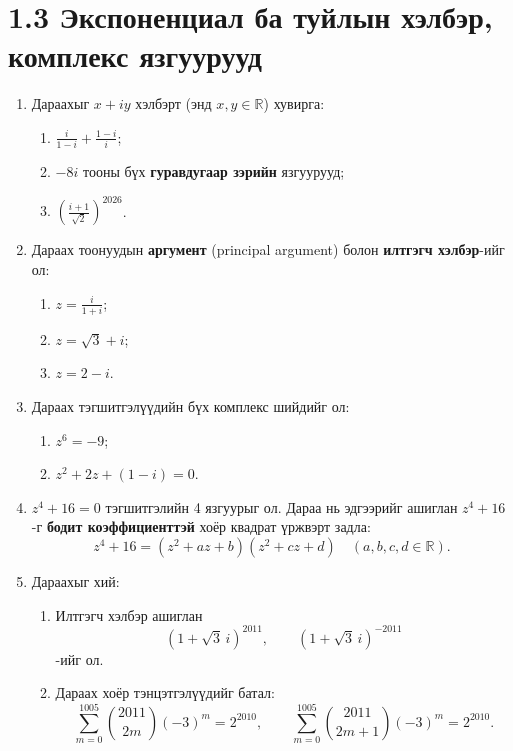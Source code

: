 \section*{1.3 Экспоненциал ба туйлын хэлбэр, комплекс язгуурууд}
\begin{enumerate}[label=\textbf{3.\arabic*}, itemsep=8pt]

\item Дараахыг $x+iy$ хэлбэрт (энд $x,y\in\mathbb R$) хувирга:
\begin{enumerate}[label=\textbf{(\alph*)}]
\item $\displaystyle \frac{i}{1-i}+\frac{1-i}{i}$;
\item $-8i$ тооны бүх \textbf{гуравдугаар зэрийн} язгуурууд;
\item $\left(\frac{i+1}{\sqrt2}\right)^{2026}$.
\end{enumerate}

\item Дараах тоонуудын \textbf{ аргумент} (principal argument) болон \textbf{илтгэгч хэлбэр}-ийг ол:
\begin{enumerate}[label=\textbf{(\alph*)}]
\item $\displaystyle z=\frac{i}{1+i}$;
\item $z=\sqrt3+i$;
\item $z=2-i$.
\end{enumerate}

\item Дараах тэгшитгэлүүдийн бүх комплекс шийдийг ол:
\begin{enumerate}[label=\textbf{(\alph*)}]
\item $z^6=-9$;
\item $z^2+2z+(1-i)=0$.
\end{enumerate}

\item $z^4+16=0$ тэгшитгэлийн 4 язгуурыг ол.
Дараа нь эдгээрийг ашиглан $z^4+16$-г \textbf{бодит коэффициенттэй} хоёр квадрат үржвэрт задла:
\[
z^4+16=(z^2+az+b)(z^2+cz+d)\quad (a,b,c,d\in\mathbb R).
\]

\item Дараахыг хий:
\begin{enumerate}[label=\textbf{(\alph*)}]
\item Илтгэгч хэлбэр ашиглан
\[
(1+\sqrt3\,i)^{2011},\qquad (1+\sqrt3\,i)^{-2011}
\]
-ийг ол.
\item Дараах хоёр тэнцэтгэлүүдийг батал:
\[
\sum_{m=0}^{1005}\binom{2011}{2m}(-3)^m=2^{2010},
\qquad
\sum_{m=0}^{1005}\binom{2011}{2m+1}(-3)^m=2^{2010}.
\]
\end{enumerate}


\end{enumerate}
